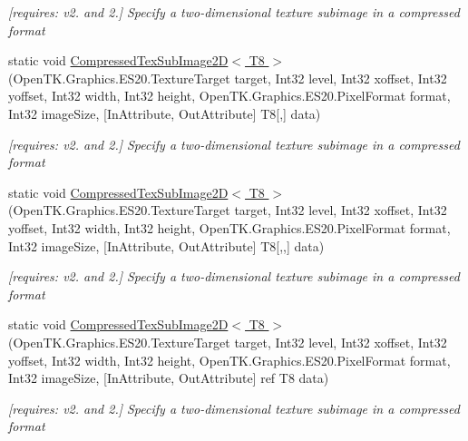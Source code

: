 \begin{DoxyCompactItemize}
\begin{DoxyCompactList}\small\item\em \mbox{[}requires\-: v2. and 2.\mbox{]} Specify a two-\/dimensional texture subimage in a compressed format \end{DoxyCompactList}\item 
static void \hyperlink{class_open_t_k_1_1_graphics_1_1_e_s20_1_1_g_l_a00ee97e8e29aa6ccfaaa0a1b5921442f}{Compressed\-Tex\-Sub\-Image2\-D$<$ T8 $>$} (Open\-T\-K.\-Graphics.\-E\-S20.\-Texture\-Target target, Int32 level, Int32 xoffset, Int32 yoffset, Int32 width, Int32 height, Open\-T\-K.\-Graphics.\-E\-S20.\-Pixel\-Format format, Int32 image\-Size, \mbox{[}In\-Attribute, Out\-Attribute\mbox{]} T8\mbox{[},\mbox{]} data)
\begin{DoxyCompactList}\small\item\em \mbox{[}requires\-: v2. and 2.\mbox{]} Specify a two-\/dimensional texture subimage in a compressed format \end{DoxyCompactList}\item 
static void \hyperlink{class_open_t_k_1_1_graphics_1_1_e_s20_1_1_g_l_a5bee37cbaafcf86adf71a819280befaa}{Compressed\-Tex\-Sub\-Image2\-D$<$ T8 $>$} (Open\-T\-K.\-Graphics.\-E\-S20.\-Texture\-Target target, Int32 level, Int32 xoffset, Int32 yoffset, Int32 width, Int32 height, Open\-T\-K.\-Graphics.\-E\-S20.\-Pixel\-Format format, Int32 image\-Size, \mbox{[}In\-Attribute, Out\-Attribute\mbox{]} T8\mbox{[},,\mbox{]} data)
\begin{DoxyCompactList}\small\item\em \mbox{[}requires\-: v2. and 2.\mbox{]} Specify a two-\/dimensional texture subimage in a compressed format \end{DoxyCompactList}\item 
static void \hyperlink{class_open_t_k_1_1_graphics_1_1_e_s20_1_1_g_l_a4f4a163beec0c74de0566b7a0771579b}{Compressed\-Tex\-Sub\-Image2\-D$<$ T8 $>$} (Open\-T\-K.\-Graphics.\-E\-S20.\-Texture\-Target target, Int32 level, Int32 xoffset, Int32 yoffset, Int32 width, Int32 height, Open\-T\-K.\-Graphics.\-E\-S20.\-Pixel\-Format format, Int32 image\-Size, \mbox{[}In\-Attribute, Out\-Attribute\mbox{]} ref T8 data)
\begin{DoxyCompactList}\small\item\em \mbox{[}requires\-: v2. and 2.\mbox{]} Specify a two-\/dimensional texture subimage in a compressed format \end{DoxyCompactList}\item 

\end{DoxyCompactItemize}
